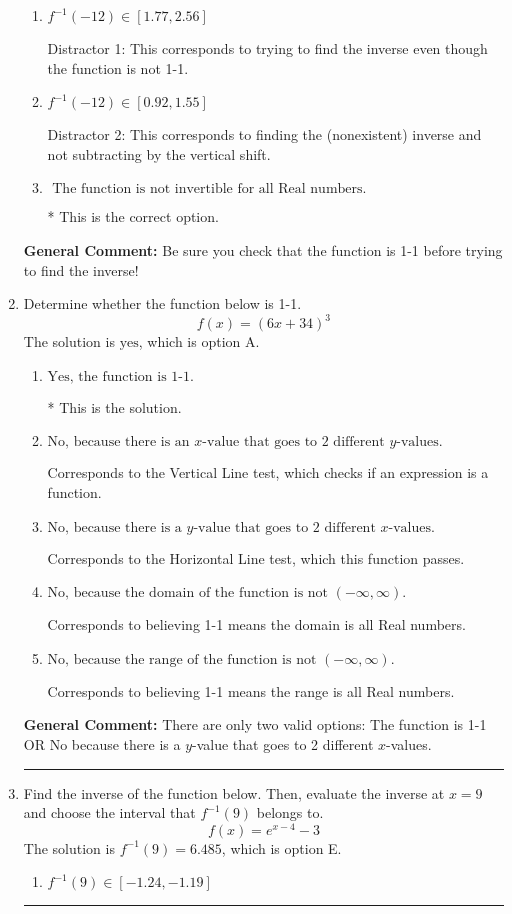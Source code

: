 \documentclass{extbook}[14pt]
\newcommand{\litem}[1]{\item #1

\rule{\textwidth}{0.4pt}}
\begin{document}
\begin{enumerate}
{\begin{enumerate}[label=\Alph*.]
 Distractor 4: This corresponds to both distractors 2 and 3.
\item \( f^{-1}(-12) \in [1.77, 2.56] \)

 Distractor 1: This corresponds to trying to find the inverse even though the function is not 1-1. 
\item \( f^{-1}(-12) \in [0.92, 1.55] \)

 Distractor 2: This corresponds to finding the (nonexistent) inverse and not subtracting by the vertical shift.
\item \( \text{ The function is not invertible for all Real numbers. } \)

* This is the correct option.
\end{enumerate}

\textbf{General Comment:} Be sure you check that the function is 1-1 before trying to find the inverse!
}
\litem{
Determine whether the function below is 1-1.
\[ f(x) = (6 x + 34)^3 \]The solution is \( \text{yes} \), which is option A.\begin{enumerate}[label=\Alph*.]
\item \( \text{Yes, the function is 1-1.} \)

* This is the solution.
\item \( \text{No, because there is an $x$-value that goes to 2 different $y$-values.} \)

Corresponds to the Vertical Line test, which checks if an expression is a function.
\item \( \text{No, because there is a $y$-value that goes to 2 different $x$-values.} \)

Corresponds to the Horizontal Line test, which this function passes.
\item \( \text{No, because the domain of the function is not $(-\infty, \infty)$.} \)

Corresponds to believing 1-1 means the domain is all Real numbers.
\item \( \text{No, because the range of the function is not $(-\infty, \infty)$.} \)

Corresponds to believing 1-1 means the range is all Real numbers.
\end{enumerate}

\textbf{General Comment:} There are only two valid options: The function is 1-1 OR No because there is a $y$-value that goes to 2 different $x$-values.
}
\litem{
Find the inverse of the function below. Then, evaluate the inverse at $x = 9$ and choose the interval that $f^{-1}(9)$ belongs to.
\[ f(x) = e^{x-4}-3 \]The solution is \( f^{-1}(9) = 6.485 \), which is option E.\begin{enumerate}[label=\Alph*.]
\item \( f^{-1}(9) \in [-1.24, -1.19] \)


\end{enumerate}}
\end{enumerate}
\end{document}
